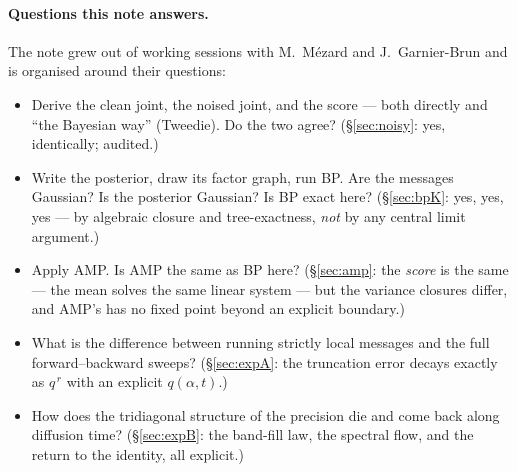 \documentclass[11pt]{article}
\theoremstyle{definition}
\begin{document}
\paragraph{Questions this note answers.}
The note grew out of working sessions with M.~M\'ezard and J.~Garnier-Brun and
is organised around their questions:
\begin{itemize}[leftmargin=1.6em, itemsep=1pt]
\item Derive the clean joint, the noised joint, and the score --- both directly
and ``the Bayesian way'' (Tweedie). Do the two agree? (\S\ref{sec:noisy}: yes,
identically; audited.)
\item Write the posterior, draw its factor graph, run BP. Are the messages
Gaussian? Is the posterior Gaussian? Is BP exact here? (\S\ref{sec:bpK}: yes,
yes, yes --- by algebraic closure and tree-exactness, \emph{not} by any central
limit argument.)
\item Apply AMP. Is AMP the same as BP here? (\S\ref{sec:amp}: the \emph{score}
is the same --- the mean solves the same linear system --- but the variance
closures differ, and AMP's has no fixed point beyond an explicit boundary.)
\item What is the difference between running strictly local messages and the
full forward--backward sweeps? (\S\ref{sec:expA}: the truncation error decays
exactly as $q^{\,r}$ with an explicit $q(\alpha,t)$.)
\item How does the tridiagonal structure of the precision die and come back
along diffusion time? (\S\ref{sec:expB}: the band-fill law, the spectral
flow, and the return to the identity, all explicit.)
\end{itemize}
\end{document}
